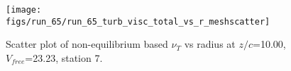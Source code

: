 \begin{figure}[H]
\centering
\texttt{[image: figs/run\_65/run\_65\_turb\_visc\_total\_vs\_r\_meshscatter]}
\caption{Scatter plot of non-equilibrium based $\nu_T$ vs radius at $z/c$=10.00, $V_{free}$=23.23, station 7.}
\label{fig:run_65_turb_visc_total_vs_r_meshscatter}
\end{figure}


